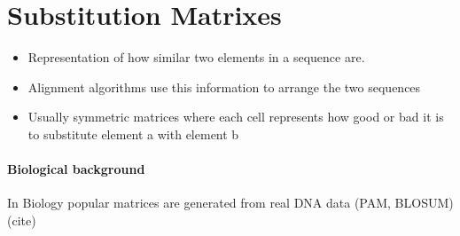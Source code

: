\section{Substitution Matrixes}
\label{sec:foundationsubstitutionmatrix}
	\begin{itemize}
		\item Representation of how similar two elements in a sequence are. 
		\item Alignment algorithms use this information to arrange the two sequences 
		\item Usually symmetric matrices where each cell represents how good or bad it is to substitute element a with element b  
	\end{itemize}
	\paragraph{Biological background}
	In Biology popular matrices are generated from real DNA data (PAM, BLOSUM) (cite)


